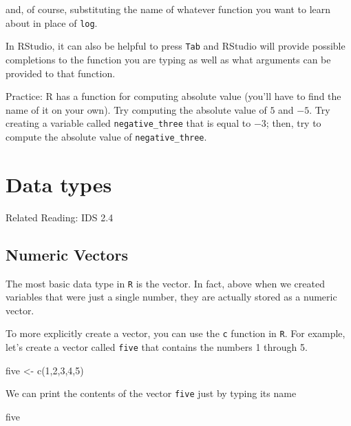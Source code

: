 \documentclass[
  letterpaper,
  DIV=11,
  numbers=noendperiod]{scrreprt}
\newenvironment{Shaded}{\begin{snugshade}}{\end{snugshade}}
\newcommand{\DecValTok}[1]{\textcolor[rgb]{0.68,0.00,0.00}{#1}}
\newcommand{\FunctionTok}[1]{\textcolor[rgb]{0.28,0.35,0.67}{#1}}
\newcommand{\NormalTok}[1]{\textcolor[rgb]{0.00,0.23,0.31}{#1}}
\newcommand{\OtherTok}[1]{\textcolor[rgb]{0.00,0.23,0.31}{#1}}
\begin{document}
and, of course, substituting the name of whatever function you want to
learn about in place of \texttt{log}.

In RStudio, it can also be helpful to press \texttt{Tab} and RStudio
will provide possible completions to the function you are typing as well
as what arguments can be provided to that function.

{Practice:} R has a function for computing absolute value (you'll have
to find the name of it on your own). Try computing the absolute value of
\(5\) and \(-5\). Try creating a variable called
\texttt{negative\_three} that is equal to \(-3\); then, try to compute
the absolute value of \texttt{negative\_three}.

\section{Data types}\label{data-types}

Related Reading: IDS 2.4

\subsection{Numeric Vectors}\label{numeric-vectors}

The most basic data type in \texttt{R} is the vector. In fact, above
when we created variables that were just a single number, they are
actually stored as a numeric vector.

To more explicitly create a vector, you can use the \texttt{c} function
in \texttt{R}. For example, let's create a vector called \texttt{five}
that contains the numbers 1 through 5.

\begin{Shaded}
\begin{Highlighting}[]
\NormalTok{  five }\OtherTok{\textless{}{-}} \FunctionTok{c}\NormalTok{(}\DecValTok{1}\NormalTok{,}\DecValTok{2}\NormalTok{,}\DecValTok{3}\NormalTok{,}\DecValTok{4}\NormalTok{,}\DecValTok{5}\NormalTok{)}
\end{Highlighting}
\end{Shaded}

We can print the contents of the vector \texttt{five} just by typing its
name

\begin{Shaded}
\begin{Highlighting}[]
\NormalTok{five}
\end{Highlighting}
\end{Shaded}
\end{document}
